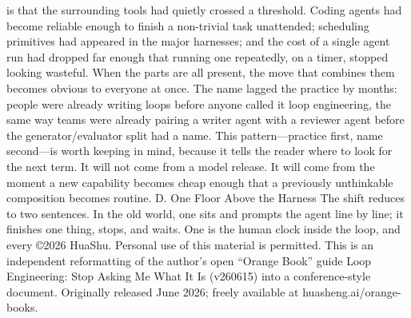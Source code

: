 \documentclass[conference]{IEEEtran}
\begin{document}
is that the surrounding tools had quietly crossed a threshold.
Coding agents had become reliable enough to finish a non-trivial
task unattended; scheduling primitives had appeared in the major
harnesses; and the cost of a single agent run had dropped far
enough that running one repeatedly, on a timer, stopped looking
wasteful. When the parts are all present, the move that combines
them becomes obvious to everyone at once. The name lagged the
practice by months: people were already writing loops before
anyone called it loop engineering, the same way teams were
already pairing a writer agent with a reviewer agent before the
generator/evaluator split had a name.
This pattern—practice first, name second—is worth keeping
in mind, because it tells the reader where to look for the next
term. It will not come from a model release. It will come
from the moment a new capability becomes cheap enough that a
previously unthinkable composition becomes routine.
D. One Floor Above the Harness
The shift reduces to two sentences. In the old world, one sits
and prompts the agent line by line; it finishes one thing, stops,
and waits. One is the human clock inside the loop, and every
©2026 HuaShu. Personal use of this material is permitted. This is an independent reformatting of the author’s open “Orange Book” guide Loop Engineering: Stop Asking Me What It Is
(v260615) into a conference-style document. Originally released June 2026; freely available at huasheng.ai/orange-books.



\end{document}
